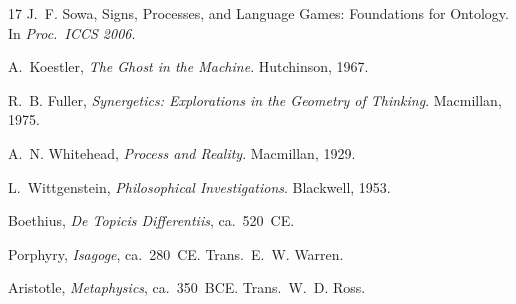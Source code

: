\documentclass{iosart2x}
\begin{document}
\begin{thebibliography}{17}
J.~F. Sowa, Signs, Processes, and Language Games: Foundations for Ontology. In \textit{Proc.\ ICCS 2006}.

A.~Koestler, \textit{The Ghost in the Machine}. Hutchinson, 1967.

R.~B. Fuller, \textit{Synergetics: Explorations in the Geometry of Thinking}. Macmillan, 1975.

A.~N. Whitehead, \textit{Process and Reality}. Macmillan, 1929.

L.~Wittgenstein, \textit{Philosophical Investigations}. Blackwell, 1953.

Boethius, \textit{De Topicis Differentiis}, ca.\ 520~CE.

Porphyry, \textit{Isagoge}, ca.\ 280~CE. Trans.\ E.~W. Warren.

Aristotle, \textit{Metaphysics}, ca.\ 350~BCE. Trans.\ W.~D. Ross.

\end{thebibliography}
\end{document}
